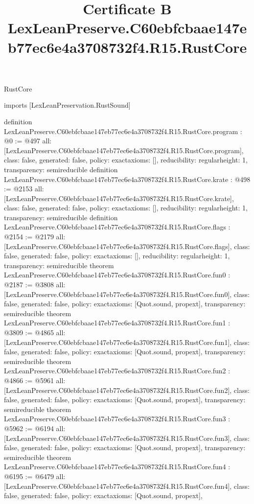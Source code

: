 \begin{lexlean}{RustCore}
\title{Certificate B LexLeanPreserve.C60ebfcbaae147eb77ec6e4a3708732f4.R15.RustCore}
\begin{coremodule}
imports [LexLeanPreservation.RustSound]

definition LexLeanPreserve.C60ebfcbaae147eb77ec6e4a3708732f4.R15.RustCore.program : @0 := @497 {
  all: [LexLeanPreserve.C60ebfcbaae147eb77ec6e4a3708732f4.R15.RustCore.program],
  class: false,
  generated: false,
  policy: exact{axioms: []},
  reducibility: regular{height: 1},
  transparency: semireducible
}
definition LexLeanPreserve.C60ebfcbaae147eb77ec6e4a3708732f4.R15.RustCore.krate : @498 := @2153 {
  all: [LexLeanPreserve.C60ebfcbaae147eb77ec6e4a3708732f4.R15.RustCore.krate],
  class: false,
  generated: false,
  policy: exact{axioms: []},
  reducibility: regular{height: 1},
  transparency: semireducible
}
definition LexLeanPreserve.C60ebfcbaae147eb77ec6e4a3708732f4.R15.RustCore.flags : @2154 := @2179 {
  all: [LexLeanPreserve.C60ebfcbaae147eb77ec6e4a3708732f4.R15.RustCore.flags],
  class: false,
  generated: false,
  policy: exact{axioms: []},
  reducibility: regular{height: 1},
  transparency: semireducible
}
theorem LexLeanPreserve.C60ebfcbaae147eb77ec6e4a3708732f4.R15.RustCore.fun0 : @2187 := @3808 {
  all: [LexLeanPreserve.C60ebfcbaae147eb77ec6e4a3708732f4.R15.RustCore.fun0],
  class: false,
  generated: false,
  policy: exact{axioms: [Quot.sound, propext]},
  transparency: semireducible
}
theorem LexLeanPreserve.C60ebfcbaae147eb77ec6e4a3708732f4.R15.RustCore.fun1 : @3809 := @4865 {
  all: [LexLeanPreserve.C60ebfcbaae147eb77ec6e4a3708732f4.R15.RustCore.fun1],
  class: false,
  generated: false,
  policy: exact{axioms: [Quot.sound, propext]},
  transparency: semireducible
}
theorem LexLeanPreserve.C60ebfcbaae147eb77ec6e4a3708732f4.R15.RustCore.fun2 : @4866 := @5961 {
  all: [LexLeanPreserve.C60ebfcbaae147eb77ec6e4a3708732f4.R15.RustCore.fun2],
  class: false,
  generated: false,
  policy: exact{axioms: [Quot.sound, propext]},
  transparency: semireducible
}
theorem LexLeanPreserve.C60ebfcbaae147eb77ec6e4a3708732f4.R15.RustCore.fun3 : @5962 := @6194 {
  all: [LexLeanPreserve.C60ebfcbaae147eb77ec6e4a3708732f4.R15.RustCore.fun3],
  class: false,
  generated: false,
  policy: exact{axioms: [Quot.sound, propext]},
  transparency: semireducible
}
theorem LexLeanPreserve.C60ebfcbaae147eb77ec6e4a3708732f4.R15.RustCore.fun4 : @6195 := @6479 {
  all: [LexLeanPreserve.C60ebfcbaae147eb77ec6e4a3708732f4.R15.RustCore.fun4],
  class: false,
  generated: false,
  policy: exact{axioms: [Quot.sound, propext]},
}
\end{coremodule}
\end{lexlean}
